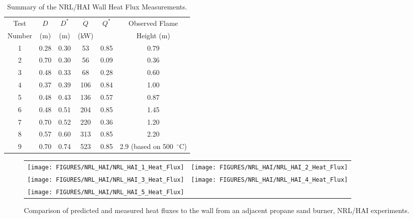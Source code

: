 \begin{table}[ht]
\caption{Summary of the NRL/HAI Wall Heat Flux Measurements. }
\begin{center}
\begin{tabular}{|c|c|c|c|c|c|}
\hline
Test     & $D$     & $D^*$      & $\dot{Q}$   & $Q^*$   & Observed  Flame \\
Number   & (m)     & (m)        & (kW)        &         & Height (m)      \\ \hline \hline
1        & 0.28    & 0.30       &  53         & 0.85    & 0.79            \\ \hline
2        & 0.70    & 0.30       &  56         & 0.09    & 0.36            \\ \hline
3        & 0.48    & 0.33       &  68         & 0.28    & 0.60            \\ \hline
4        & 0.37    & 0.39       &  106        & 0.84    & 1.00            \\ \hline
5        & 0.48    & 0.43       &  136        & 0.57    & 0.87            \\ \hline
6        & 0.48    & 0.51       &  204        & 0.85    & 1.45            \\ \hline
7        & 0.70    & 0.52       &  220        & 0.36    & 1.20            \\ \hline
8        & 0.57    & 0.60       &  313        & 0.85    & 2.20            \\ \hline
9        & 0.70    & 0.74       &  523        & 0.85    & 2.9 (based on 500~$^\circ$C)       \\ \hline
\end{tabular}
\end{center}
\label{NRL/HAI_Parameters}
\end{table}

\newpage

\begin{figure}[p]
\begin{tabular*}{\textwidth}{l@{\extracolsep{\fill}}r}
\texttt{[image: FIGURES/NRL\_HAI/NRL\_HAI\_1\_Heat\_Flux]} &
\texttt{[image: FIGURES/NRL\_HAI/NRL\_HAI\_2\_Heat\_Flux]} \\
\texttt{[image: FIGURES/NRL\_HAI/NRL\_HAI\_3\_Heat\_Flux]} &
\texttt{[image: FIGURES/NRL\_HAI/NRL\_HAI\_4\_Heat\_Flux]} \\
\texttt{[image: FIGURES/NRL\_HAI/NRL\_HAI\_5\_Heat\_Flux]} &
\end{tabular*}
\label{NRL_HAI_1}
\caption[Wall heat flux predictions, NRL/HAI experiments.]
{Comparison of predicted and measured heat fluxes to the wall from an adjacent propane sand burner, NRL/HAI experiments.}
\end{figure}

